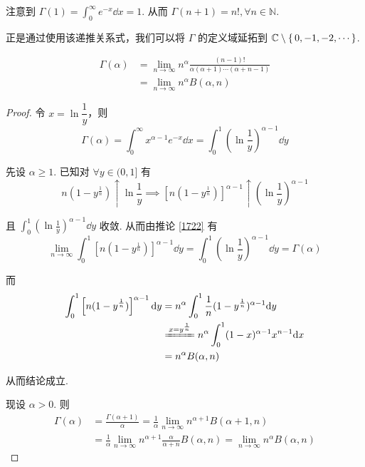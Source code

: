 注意到 $\Gamma(1)=\displaystyle\int_0^\infty e^{-x}\dd x=1$. 从而 $\Gamma(n+1)=n!,\forall n\in\mathbb{N}$.

\begin{hint}
    正是通过使用该递推关系式，我们可以将 $\Gamma$ 的定义域延拓到 $\mathbb{C}\setminus\set{0,-1,-2,\cdots}$.
\end{hint}


\begin{property}
$$
\begin{aligned}
    \Gamma(\alpha)&=\lim_{n\to\infty}n^\alpha\frac{(n-1)!}{\alpha(\alpha+1)\cdots(\alpha+n-1)}\\
    &=\lim_{n\to\infty}n^\alpha B(\alpha,n)
\end{aligned}
$$
\end{property}
\begin{proof}
    令 $x=\ln\dfrac{1}{y}$，则
$$
\Gamma(\alpha)=\int_0^\infty x^{\alpha-1}e^{-x}\dd x=\int_0^1\left(\ln\frac{1}{y}\right)^{\alpha-1}\dd y
$$

    先设 $\alpha\ge 1$. 已知对 $\forall y\in(0,1]$ 有
$$
n(1-y^\frac{1}{n})\uparrow\ln\frac{1}{y}\implies\left[n(1-y^\frac{1}{n})\right]^{\alpha-1}\uparrow\left(\ln\frac{1}{y}\right)^{\alpha-1}
$$

    且 $\displaystyle\int_0^1\left(\ln\frac{1}{y}\right)^{\alpha-1}\dd y$ 收敛. 从而由推论 \ref{1722} 有
$$
\lim_{n\to\infty}\int_0^1\left[n(1-y^\frac{1}{n})\right]^{\alpha-1}\dd y=\int_0^1\left(\ln\frac{1}{y}\right)^{\alpha-1}\dd y=\Gamma(\alpha)
$$

    而
$$
\begin{aligned}
    \int_0^1\left[n(1-y^\frac{1}{n})\right]^{\alpha-1}\dd y&=n^\alpha\int_0^1\frac{1}{n}(1-y^\frac{1}{n})^{\alpha-1}\dd y\\
    &\xlongequal{x=y^\frac{1}{n}}n^\alpha\int_0^1(1-x)^{\alpha-1}x^{n-1}\dd x\\
    &=n^\alpha B(\alpha,n)
\end{aligned}
$$

    从而结论成立.

    现设 $\alpha>0$. 则
$$
\begin{aligned}
    \Gamma(\alpha)&=\frac{\Gamma(\alpha+1)}{\alpha}=\frac{1}{\alpha}\lim_{n\to\infty}n^{\alpha+1}B(\alpha+1,n)\\
    &=\frac{1}{\alpha}\lim_{n\to\infty}n^{\alpha+1}\frac{\alpha}{\alpha+n}B(\alpha,n)=\lim_{n\to\infty}n^\alpha B(\alpha,n)
\end{aligned}
$$
\end{proof}